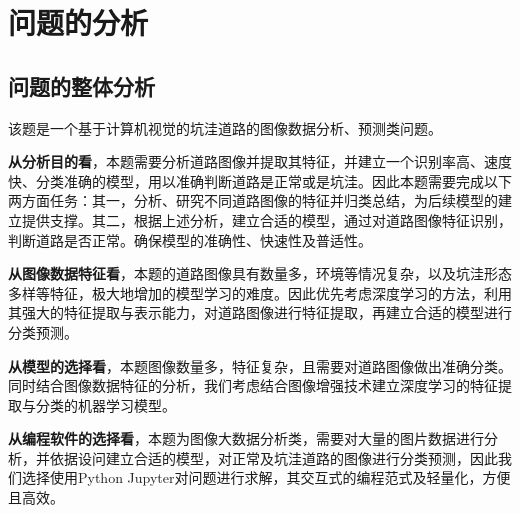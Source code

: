 \documentclass{MathorCupmodeling}
\begin{document}
	\section{问题的分析}
	\subsection{问题的整体分析}
	该题是一个基于计算机视觉的坑洼道路的图像数据分析、预测类问题。

	\textbf{从分析目的看}，本题需要分析道路图像并提取其特征，并建立一个识别率高、速度快、分类准确的模型，用以准确判断道路是正常或是坑洼。因此本题需要完成以下两方面任务：{\heiti 其一}，分析、研究不同道路图像的特征并归类总结，为后续模型的建立提供支撑。{\heiti 其二}，根据上述分析，建立合适的模型，通过对道路图像特征识别，判断道路是否正常。确保模型的准确性、快速性及普适性。

	\textbf{从图像数据特征看}，本题的道路图像具有数量多，环境等情况复杂，以及坑洼形态多样等特征，极大地增加的模型学习的难度。因此优先考虑深度学习的方法，利用其强大的特征提取与表示能力，对道路图像进行特征提取，再建立合适的模型进行分类预测。

	\textbf{从模型的选择看}，本题图像数量多，特征复杂，且需要对道路图像做出准确分类。同时结合图像数据特征的分析，我们考虑结合图像增强技术建立深度学习的特征提取与分类的机器学习模型。

	\textbf{从编程软件的选择看}，本题为图像大数据分析类，需要对大量的图片数据进行分析，并依据设问建立合适的模型，对正常及坑洼道路的图像进行分类预测，因此我们选择使用Python Jupyter对问题进行求解，其交互式的编程范式及轻量化，方便且高效。
\end{document}
